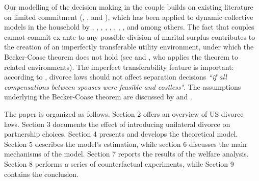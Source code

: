 \documentclass[12pt]{article}
\numberwithin{table}{section}
\begin{document}
Our modelling of the decision making in the couple builds on existing literature on limited commitment (\cite{kk1996},  \cite{ligon2002}, \cite{marcet2019} and \cite{pavoni2018}), which has been applied to dynamic collective models in the household by \cite{mazzocco2007}, \cite{mazzocco2013}, \cite{bayot2015}, \cite{rigas2015}, \cite{voena2015}, \cite{abraham2018}, \cite{lise2018}, \cite{low2018}, \cite{foerster2019} and \cite{reynoso2019} among others. The fact that couples cannot commit ex-ante to any possible division of marital surplus contributes to the creation of an imperfectly transferable utility environment, under which the Becker-Coase theorem does not hold (see \cite{galichon2019} and \cite{weber2018}, who applies the theorem to related environments). The imperfect transferability feature is important: according to \cite{becker1977}, divorce laws should not affect separation decisions \textit{``if all compensations between spouses were feasible and costless"}. The assumptions underlying the Becker-Coase theorem are discussed by \cite{chiappori2015} and \cite{fella2004}.


The paper is organized as follows. Section 2 offers an overview of US divorce laws. Section 3 documents the effect of introducing unilateral divorce on partnership choices. Section 4 presents and develops the theoretical model. Section 5 describes the model's estimation, while section 6 discusses the main mechanisms of the model. Section 7 reports the results of the welfare analysis. Section 8 performs a series of counterfactual experiments, while Section 9 contains the conclusion.

%
\end{document}
